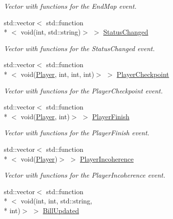 \begin{DoxyCompactItemize}
\begin{DoxyCompactList}\small\item\em Vector with functions for the End\-Map event. \end{DoxyCompactList}\item 
\hypertarget{classPlugin_a1d1a7c5ee8f037cc4277225994829902}{std\-::vector$<$ std\-::function\\*
$<$ void(int, std\-::string)$>$ $>$ \hyperlink{classPlugin_a1d1a7c5ee8f037cc4277225994829902}{Status\-Changed}}\label{classPlugin_a1d1a7c5ee8f037cc4277225994829902}

\begin{DoxyCompactList}\small\item\em Vector with functions for the Status\-Changed event. \end{DoxyCompactList}\item 
\hypertarget{classPlugin_abc2ce0103b7783a4ff4b3009cb18af7b}{std\-::vector$<$ std\-::function\\*
$<$ void(\hyperlink{structPlayer}{Player}, int, int, int)$>$ $>$ \hyperlink{classPlugin_abc2ce0103b7783a4ff4b3009cb18af7b}{Player\-Checkpoint}}\label{classPlugin_abc2ce0103b7783a4ff4b3009cb18af7b}

\begin{DoxyCompactList}\small\item\em Vector with functions for the Player\-Checkpoint event. \end{DoxyCompactList}\item 
\hypertarget{classPlugin_a16aadb48218d18235979314d259699aa}{std\-::vector$<$ std\-::function\\*
$<$ void(\hyperlink{structPlayer}{Player}, int)$>$ $>$ \hyperlink{classPlugin_a16aadb48218d18235979314d259699aa}{Player\-Finish}}\label{classPlugin_a16aadb48218d18235979314d259699aa}

\begin{DoxyCompactList}\small\item\em Vector with functions for the Player\-Finish event. \end{DoxyCompactList}\item 
\hypertarget{classPlugin_abcc9fff7f98ac9a872a965f0809b7f53}{std\-::vector$<$ std\-::function\\*
$<$ void(\hyperlink{structPlayer}{Player})$>$ $>$ \hyperlink{classPlugin_abcc9fff7f98ac9a872a965f0809b7f53}{Player\-Incoherence}}\label{classPlugin_abcc9fff7f98ac9a872a965f0809b7f53}

\begin{DoxyCompactList}\small\item\em Vector with functions for the Player\-Incoherence event. \end{DoxyCompactList}\item 
\hypertarget{classPlugin_a44ef1f6774366dd3dcc588d7c7afbc8a}{std\-::vector$<$ std\-::function\\*
$<$ void(int, int, std\-::string, \\*
int)$>$ $>$ \hyperlink{classPlugin_a44ef1f6774366dd3dcc588d7c7afbc8a}{Bill\-Updated}}\label{classPlugin_a44ef1f6774366dd3dcc588d7c7afbc8a}


\end{DoxyCompactItemize}
